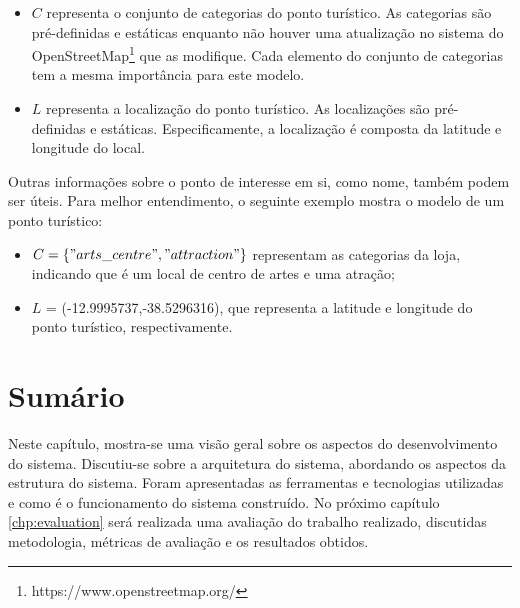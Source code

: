 \begin{itemize}
    \item $C$ representa o conjunto de categorias do ponto turístico. As categorias são pré-definidas e estáticas enquanto não houver uma atualização no sistema do OpenStreetMap\footnote{https://www.openstreetmap.org/} que as modifique. Cada elemento do conjunto de categorias tem a mesma importância para este modelo.
    \item $L$ representa a localização do ponto turístico. As localizações são pré-definidas e estáticas. Especificamente, a localização é composta da latitude e longitude do local.
\end{itemize}

Outras informações sobre o ponto de interesse em si, como nome, também podem ser úteis. Para melhor entendimento, o seguinte exemplo mostra o modelo de um ponto turístico:

\begin{itemize}
    \item $C = \{"arts\_centre", "attraction"\}$ representam as categorias da loja, indicando que é um local de centro de artes e uma atração;
    \item $L$ = (-12.9995737,-38.5296316), que representa a latitude e longitude do ponto turístico, respectivamente.
\end{itemize}

\section{Sumário}

Neste capítulo, mostra-se uma visão geral sobre os aspectos do desenvolvimento do sistema. Discutiu-se sobre a arquitetura do sistema, abordando os aspectos da estrutura do sistema. Foram apresentadas as ferramentas e tecnologias utilizadas e como é o funcionamento do sistema construído. No próximo capítulo \ref{chp:evaluation} será realizada uma avaliação do trabalho realizado, discutidas metodologia, métricas de avaliação e os resultados obtidos.